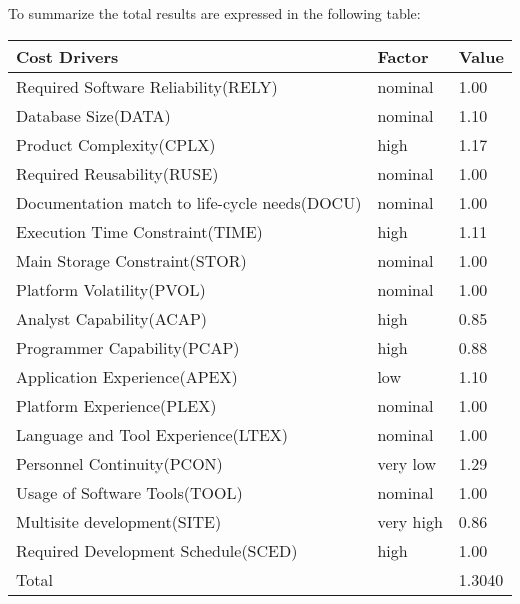 To summarize the total results are expressed in the following table:
\begin{longtable}{| m{9 cm}| m{3 cm} | m{3 cm} | }
\hline
\textbf{Cost Drivers} & \textbf{Factor} & \textbf{Value} \\
\hline
Required Software Reliability(RELY) & nominal & 1.00 \\
\hline
Database Size(DATA) & nominal & 1.10 \\
\hline
Product Complexity(CPLX) & high & 1.17 \\
\hline
Required Reusability(RUSE) & nominal & 1.00 \\
\hline
Documentation match to life-cycle needs(DOCU) & nominal & 1.00 \\
\hline
Execution Time Constraint(TIME) & high & 1.11 \\
\hline
Main Storage Constraint(STOR) & nominal & 1.00 \\
\hline
Platform Volatility(PVOL) & nominal & 1.00 \\
\hline
Analyst Capability(ACAP) & high & 0.85 \\
\hline
Programmer Capability(PCAP) & high & 0.88 \\
\hline
Application Experience(APEX) & low & 1.10 \\
\hline
Platform Experience(PLEX) & nominal & 1.00 \\
\hline
Language and Tool Experience(LTEX) & nominal & 1.00 \\
\hline
Personnel Continuity(PCON) & very low & 1.29 \\
\hline
Usage of Software Tools(TOOL) & nominal & 1.00 \\
\hline
Multisite development(SITE) & very high & 0.86 \\
\hline
Required Development Schedule(SCED) & high & 1.00 \\
\hline
\multicolumn{2}{l}{Total} & 1.3040\\
\hline
\end{longtable}